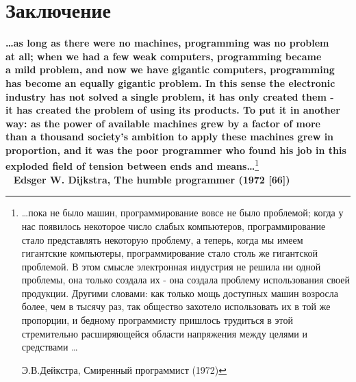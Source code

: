 \documentclass{mai_book}
\begin{document}
\section{Заключение}

\begin{flushright} 
\textbf{\dots as long as there were no machines, programming was no problem \\ at all; when we had a few weak computers, programming became \\ a mild problem, and now we have gigantic computers, programming\\ has become an equally gigantic problem. In this sense the electronic\\ industry has not solved a single problem, it has only created them - \\ it has created the problem of using its products. To put it in another\\ way:  as the power of available machines grew by a factor of more\\ than a thousand society's ambition to apply these machines grew in\\ proportion, and it was the poor programmer who found his job in this\\ exploded field of tension between ends and means\dots}\footnote{\dots пока не было машин, программирование вовсе не было проблемой; когда у нас появилось некоторое число слабых компьютеров, программирование стало представлять некоторую проблему, а теперь, когда мы имеем гигантские компьютеры, программирование стало столь же гигантской проблемой. В этом смысле электронная индустрия не решила ни одной проблемы, она только создала их - она создала проблему использования своей продукции. Другими словами: как только мощь доступных машин возросла более, чем в тысячу раз, так общество захотело использовать их в той же пропорции, и бедному программисту пришлось трудиться в этой стремительно расширяющейся области напряжения между целями и средствами \dots

                                                                     Э.В.Дейкстра, Смиренный программист (1972)}
\\
\ \newline
\textbf{Edsger W. Dijkstra, The humble programmer (1972 [66])}
\end{flushright}
\end{document}
